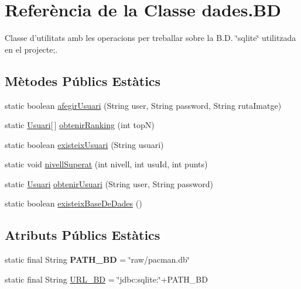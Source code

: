 \hypertarget{classdades_1_1_b_d}{\section{Referència de la Classe dades.\+B\+D}
\label{classdades_1_1_b_d}
}


Classe d'utilitats amb les operacions per treballar sobre la B.\+D. \char`\"{}sqlite\char`\"{} utilitzada en el projecte;.  


\subsection*{Mètodes Públics Estàtics}
\begin{DoxyCompactItemize}
\item 
static boolean \hyperlink{classdades_1_1_b_d_aebeb79a5b559c404967e7af4a51fbe07}{afegir\+Usuari} (String user, String password, String ruta\+Imatge)
\item 
static \hyperlink{classlogica_1_1_usuari}{Usuari}\mbox{[}$\,$\mbox{]} \hyperlink{classdades_1_1_b_d_adecdaacdefdcf4c26e307c3c6b13cbca}{obtenir\+Ranking} (int top\+N)
\item 
static boolean \hyperlink{classdades_1_1_b_d_ad5629c3a6ea389ca0ec6fe6f71f49e5a}{existeix\+Usuari} (String usuari)
\item 
static void \hyperlink{classdades_1_1_b_d_aee65076de634577866799db9ea3315b8}{nivell\+Superat} (int nivell, int usu\+Id, int punts)
\item 
static \hyperlink{classlogica_1_1_usuari}{Usuari} \hyperlink{classdades_1_1_b_d_ae8a0bfc4f5c75e66fd6ba1a6c9568b07}{obtenir\+Usuari} (String user, String password)
\item 
static boolean \hyperlink{classdades_1_1_b_d_a60b00af9b05e556fd66b8dbf69e012cd}{existeix\+Base\+De\+Dades} ()
\end{DoxyCompactItemize}
\subsection*{Atributs Públics Estàtics}
\begin{DoxyCompactItemize}
\item 
\hypertarget{classdades_1_1_b_d_a9d49f7827869e7e71b4527473b673ce8}{static final String {\bfseries P\+A\+T\+H\+\_\+\+B\+D} = \char`\"{}raw/pacman.\+db\char`\"{}}\label{classdades_1_1_b_d_a9d49f7827869e7e71b4527473b673ce8}

\item 
static final String \hyperlink{classdades_1_1_b_d_abc83c541acdcd0be2ae8a33daa753077}{U\+R\+L\+\_\+\+B\+D} = \char`\"{}jdbc\+:sqlite\+:\char`\"{}+P\+A\+T\+H\+\_\+\+B\+D
\end{DoxyCompactItemize}


